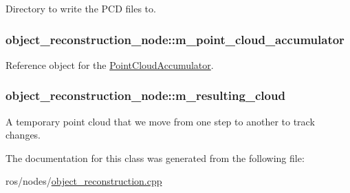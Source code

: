 \-Directory to write the \-P\-C\-D files to. 

\hypertarget{classobject__reconstruction__node_aa3895b09cfc1f4e4ace4f7c28515b89d}{
\subsubsection[{m\-\_\-point\-\_\-cloud\-\_\-accumulator}]{ {\bf object\-\_\-reconstruction\-\_\-node\-::m\-\_\-point\-\_\-cloud\-\_\-accumulator}}}\label{classobject__reconstruction__node_aa3895b09cfc1f4e4ace4f7c28515b89d}


\-Reference object for the \hyperlink{class_point_cloud_accumulator}{\-Point\-Cloud\-Accumulator}. 

\hypertarget{classobject__reconstruction__node_ab8f97cd647f37bc708c8d7542150c17c}{
\subsubsection[{m\-\_\-resulting\-\_\-cloud}]{ {\bf object\-\_\-reconstruction\-\_\-node\-::m\-\_\-resulting\-\_\-cloud}}}\label{classobject__reconstruction__node_ab8f97cd647f37bc708c8d7542150c17c}


\-A temporary point cloud that we move from one step to another to track changes. 



\-The documentation for this class was generated from the following file\-:\begin{DoxyCompactItemize}
\item 
ros/nodes/\hyperlink{object__reconstruction_8cpp}{object\-\_\-reconstruction.\-cpp}\end{DoxyCompactItemize}
